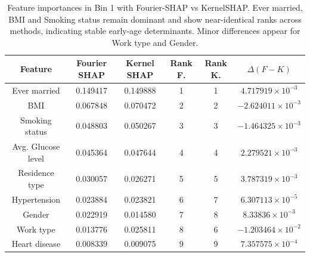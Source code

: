 \documentclass[letterpaper,11pt]{article}
\numberwithin{equation}{section}
\numberwithin{equation}{section}
\begin{document}
\begin{table}[H]
    \centering
    \begin{tabular}{|c||c|c|c|c|c|} \hline 
         Feature & Fourier SHAP & Kernel SHAP & Rank F. & Rank K. & $\Delta (F-K) $ \\ \hline \hline 
         Ever married & 0.149417 & 0.149888 & 1 & 1 & $4.717919\times 10^{-3}$ \\ \hline 
         BMI & 0.067848 & 0.070472 & 2 & 2 & $-2.624011\times 10^{-3}$ \\ \hline 
         Smoking status & 0.048803 & 0.050267 & 3 & 3 & $-1.464325 \times 10^{-3}$ \\ \hline 
         Avg. Glucose level & 0.045364 & 0.047644 & 4 & 4 & $2.279521 \times 10^{-3}$ \\ \hline 
         Residence type & 0.030057 & 0.026271 & 5 & 5 & $3.787319 \times 10^{-3}$ \\ \hline 
         Hypertension & 0.023884 & 0.023821 & 6 & 7 & $6.307113 \times 10^{-5}$ \\ \hline 
         Gender & 0.022919 & 0.014580 & 7 & 8 & $8.33836\times 10^{-3}$ \\ \hline 
         Work type & 0.013776 & 0.025811 & 8 & 6 & $-1.203464 \times 10^{-2}$ \\ \hline
         Heart disease & 0.008339 & 0.009075 & 9 & 9 & $7.357575\times 10^{-4}$ \\ \hline
    \end{tabular}
    \caption{Feature importances in Bin 1 with Fourier-SHAP vs KernelSHAP. Ever married, BMI and Smoking status remain dominant and show near-identical ranks across methods, indicating stable early-age determinants. Minor differences appear for Work type and Gender.}
\end{table}
\end{document}
